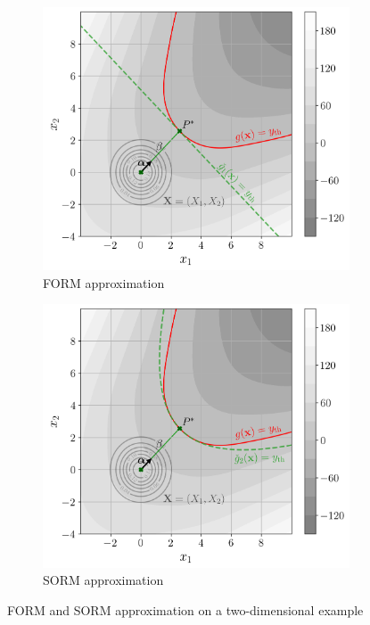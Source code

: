 \begin{figure}[ht]
    \centering
    \begin{subfigure}[b]{0.48\textwidth}
        \centering
        \includegraphics[width=\textwidth]{../numerical_experiments/chapter1/figures/reliability_FORM_illustration.png}
        \caption{FORM approximation}
    \end{subfigure}
    \quad
    \begin{subfigure}[b]{0.48\textwidth}
        \centering
        \includegraphics[width=\textwidth]{../numerical_experiments/chapter1/figures/reliability_SORM_illustration.png}
        \caption{SORM approximation}
    \end{subfigure}
       \caption{FORM and SORM approximation on a two-dimensional example}
       \label{fig:FORM_SORM_approx}
\end{figure}


